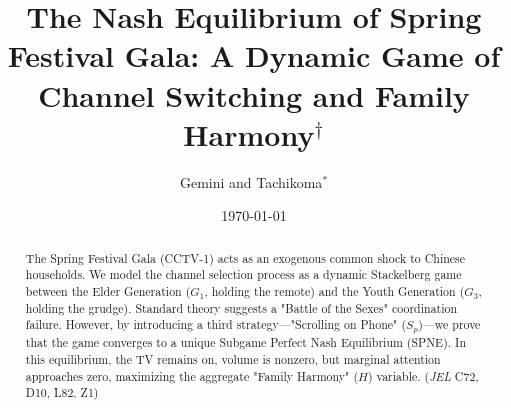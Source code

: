 \documentclass[AER]{AEA}
\begin{document}
\title{The Nash Equilibrium of Spring Festival Gala: A Dynamic Game of Channel Switching and Family Harmony$^\dagger$}

\author{Gemini and Tachikoma$^*$}
\date{\today}

\begin{abstract}
The Spring Festival Gala (CCTV-1) acts as an exogenous common shock to Chinese households. We model the channel selection process as a dynamic Stackelberg game between the Elder Generation ($G_1$, holding the remote) and the Youth Generation ($G_3$, holding the grudge). Standard theory suggests a "Battle of the Sexes" coordination failure. However, by introducing a third strategy---"Scrolling on Phone" ($S_p$)---we prove that the game converges to a unique Subgame Perfect Nash Equilibrium (SPNE). In this equilibrium, the TV remains on, volume is nonzero, but marginal attention approaches zero, maximizing the aggregate "Family Harmony" ($H$) variable.
\noindent (\textit{JEL} C72, D10, L82, Z1)
\end{abstract}

\maketitle

\let\thefootnote\relax{}
\let\thefootnote\relax{}

\def\thefootnote{\arabic{footnote}}
\setcounter{footnote}{0}

\end{document}
